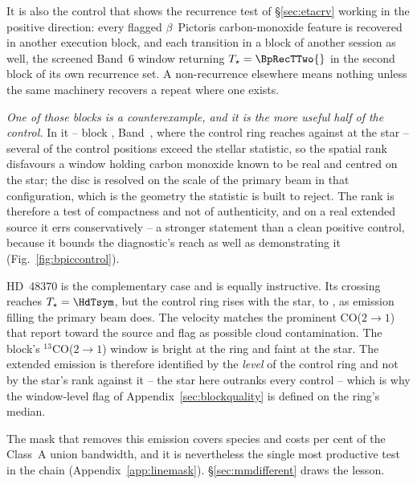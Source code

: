 It is also the control that shows the recurrence test of
\S\ref{sec:etacrv} working in the positive direction: every flagged
$\beta$~Pictoris carbon-monoxide feature is recovered in another execution
block, and each transition in a block of another session as well, the
screened Band~6 window returning
$T_\star=\BpRecTTwo{}$ in the second block of its own recurrence set. A
non-recurrence elsewhere means nothing unless the same machinery recovers a
repeat where one exists.

\emph{One of those blocks is a counterexample, and it is the more useful half
of the control.} In it -- block \texttt{\BpCtrlBlock}, Band~\BpCtrlBand,
where the control ring reaches \BpCtrlRingMax{} against \BpCtrlStar{} at the
star -- several of the \NCtrl{} control positions exceed the
stellar statistic, so the spatial rank disfavours a window holding carbon
monoxide known to be real and centred on the star; the disc is resolved on
the scale of the primary beam in that configuration, which is the geometry
the statistic is built to reject. The rank is therefore a test of
compactness and not of authenticity, and on a real extended source it errs
conservatively -- a stronger statement than a clean positive control, because
it bounds the diagnostic's reach as well as demonstrating it
(Fig.~\ref{fig:bpiccontrol}).



HD~48370 is the complementary case and is equally instructive. Its crossing
reaches $T_\star=\HdTsym$, but the control ring rises with the star, to
\HdRingMax, as emission filling the primary beam does. The velocity matches
the prominent CO($2{\to}1$) that \citet{Cataldi2023} report toward the
source and flag as possible cloud contamination. The block's
$^{13}$CO($2{\to}1$) window is bright at the ring and faint at the star.
The extended emission is therefore identified by the \emph{level} of the
control ring and not by the star's rank against it -- the star here outranks
every control -- which is why the window-level flag of
Appendix~\ref{sec:blockquality} is defined on the ring's median.

The mask that removes this emission covers \FrNSpec{} species and costs
\MkMaskAPct{} per cent of the Class~A union bandwidth, and it is nevertheless
the single most productive test in the chain
(Appendix~\ref{app:linemask}). \S\ref{sec:mmdifferent} draws the lesson.

